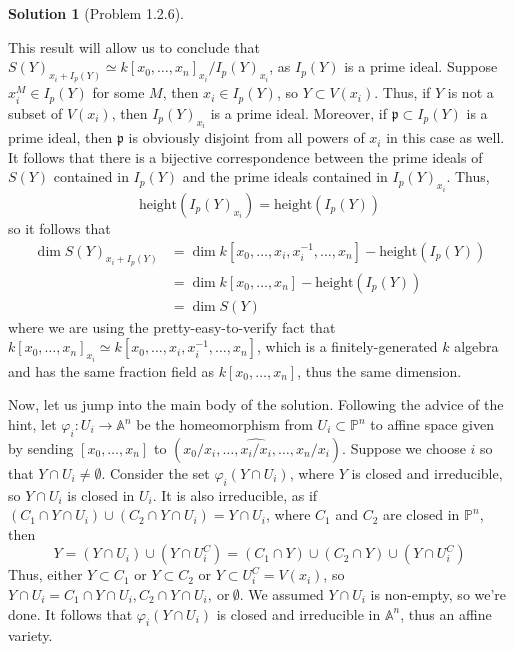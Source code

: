\documentclass[aps,pra,showpacs,notitlepage,onecolumn,superscriptaddress,nofootinbib]{revtex4-1}
\theoremstyle{definition}
\newtheorem{solution}{Solution}[section]
\begin{document}
\begin{solution}[Problem 1.2.6]
\begin{enumerate}
        This result will allow us to conclude that $S(Y)_{x_i + I_p(Y)} \simeq k[x_0, \dots, x_n]_{x_i}/I_p(Y)_{x_i}$, as $I_p(Y)$ is a prime ideal. Suppose $x_i^{M} \in I_p(Y)$ for some $M$, then $x_i \in I_p(Y)$, so $Y \subset V(x_i)$.
        Thus, if $Y$ is not a subset of $V(x_i)$, then $I_p(Y)_{x_i}$ is a prime ideal. Moreover, if $\mathfrak{p} \subset I_p(Y)$ is a prime ideal, then $\mathfrak{p}$ is obviously disjoint from all powers of $x_i$ in
        this case as well. It follows that there is a bijective correspondence between the prime ideals of $S(Y)$ contained in $I_p(Y)$ and the prime ideals contained in $I_p(Y)_{x_i}$. Thus,
        \begin{equation}
          \text{height}(I_p(Y)_{x_i}) = \text{height}(I_p(Y))
          \end{equation}
        so it follows that
        \begin{align}
          \dim S(Y)_{x_i + I_p(Y)} &= \dim k[x_0, \dots, x_i, x_i^{-1}, \dots, x_n] - \text{height}(I_p(Y))
          \\ &= \dim k[x_0, \dots, x_n] - \text{height}(I_p(Y))
          \\ &= \dim S(Y)
          \end{align}
        where we are using the pretty-easy-to-verify fact that $k[x_0, \dots, x_n]_{x_i} \simeq k[x_0, \dots, x_i, x_i^{-1}, \dots, x_n]$, which is a finitely-generated $k$ algebra and
        has the same fraction field as $k[x_0, \dots, x_n]$, thus the same dimension.
  \end{enumerate}

  Now, let us jump into the main body of the solution. Following the advice of the hint, let $\varphi_i : U_i \rightarrow \mathbb{A}^n$ be the homeomorphism from $U_i \subset \mathbb{P}^n$ to affine
  space given by sending $[x_0, \dots, x_n]$ to $(x_0/x_i, \dots, \widehat{x_i/x_i}, \dots, x_n/x_i)$. Suppose we choose $i$ so that $Y \cap U_i \neq \emptyset$.
  Consider the set $\varphi_i(Y \cap U_i)$, where $Y$ is closed and irreducible, so $Y \cap U_i$ is closed in $U_i$. It is also irreducible, as if $(C_1 \cap Y \cap U_i) \cup (C_2 \cap Y \cap U_i) = Y \cap U_i$, where $C_1$ and $C_2$ are closed in
  $\mathbb{P}^n$, then
  \begin{equation}
  Y = (Y \cap U_i) \cup (Y \cap U_i^{C}) = (C_1 \cap Y) \cup (C_2 \cap Y) \cup (Y \cap U_i^{C})
  \end{equation}
  Thus, either $Y \subset C_1$ or $Y \subset C_2$ or $Y \subset U_i^{C} = V(x_i)$, so $Y \cap U_i = C_1 \cap Y \cap U_i, C_2 \cap Y \cap U_i, \ \text{or} \ \emptyset$. We assumed $Y \cap U_i$ is non-empty, so we're done.
  It follows that $\varphi_i(Y \cap U_i)$ is closed and irreducible in $\mathbb{A}^n$, thus an affine variety.


\end{solution}
\end{document}
